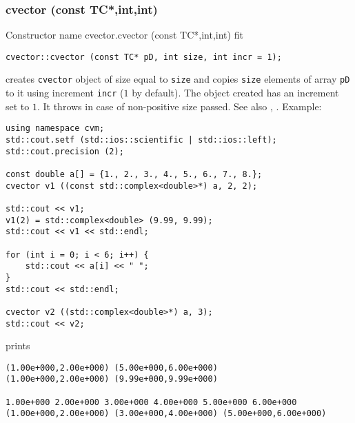 \subsubsection{cvector (const TC*,int,int)}
Constructor%
\pdfdest name {cvector.cvector (const TC*,int,int)} fit
\begin{verbatim}
cvector::cvector (const TC* pD, int size, int incr = 1);
\end{verbatim}
creates  \verb"cvector" object of size equal to \verb"size"
and copies \verb"size" elements of
 array \verb"pD" to it using increment \verb"incr" ($1$ by default).
The object created has an increment set to $1$.
It throws  
in case of non-positive size passed.
See also , .
Example:
\begin{Verbatim}
using namespace cvm;
std::cout.setf (std::ios::scientific | std::ios::left);
std::cout.precision (2);

const double a[] = {1., 2., 3., 4., 5., 6., 7., 8.};
cvector v1 ((const std::complex<double>*) a, 2, 2);

std::cout << v1;
v1(2) = std::complex<double> (9.99, 9.99);
std::cout << v1 << std::endl;

for (int i = 0; i < 6; i++) {
    std::cout << a[i] << " ";
}
std::cout << std::endl;

cvector v2 ((std::complex<double>*) a, 3);
std::cout << v2;
\end{Verbatim}
prints
\begin{Verbatim}
(1.00e+000,2.00e+000) (5.00e+000,6.00e+000)
(1.00e+000,2.00e+000) (9.99e+000,9.99e+000)

1.00e+000 2.00e+000 3.00e+000 4.00e+000 5.00e+000 6.00e+000
(1.00e+000,2.00e+000) (3.00e+000,4.00e+000) (5.00e+000,6.00e+000)
\end{Verbatim}
\newpage




